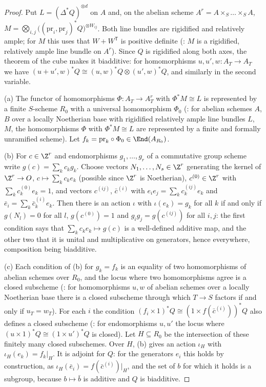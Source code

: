 \begin{proof}
Put $L=(\Delta^*Q)^{\otimes d}$ on $A$ and, on the abelian scheme $A^r=A\times_S\dots\times_SA$,
$M=\bigotimes_{i,j}\bigl((\mathrm{pr}_i,\mathrm{pr}_j)^*Q\bigr)^{\otimes W_{ij}}$. Both line bundles are rigidified and relatively ample; for
$M$ this uses that $W+W^{\mathsf T}$ is positive definite (: $M$ is a rigidified, relatively ample
line bundle on $A^r$). Since $Q$ is rigidified along both axes, the theorem of the cube makes it biadditive: for homomorphisms
$u,u',w:A_T\to A_T$ we have $(u+u',w)^*Q\cong(u,w)^*Q\otimes(u',w)^*Q$, and similarly in the second variable.

(a) The functor of homomorphisms $\Phi:A_T\to A^r_T$ with $\Phi^*M\cong L$ is represented by a finite $S$-scheme $R_0$ with a universal
homomorphism $\Phi_0$ (: for abelian schemes $A$, $B$ over a
locally Noetherian base with rigidified relatively ample line bundles $L$, $M$, the homomorphisms $\Phi$ with $\Phi^*M\cong L$ are represented
by a finite and formally unramified scheme). Let $f_k=\mathrm{pr}_k\circ\Phi_0\in\End(A_{R_0})$.

(b) For $c\in\Z^r$ and endomorphisms $g_1,\dots,g_r$ of a commutative group scheme write $g(c)=\sum_kc_kg_k$. Choose vectors
$N_1,\dots,N_s\in\Z^r$ generating the kernel of $\Z^r\to O$, $c\mapsto\sum_kc_ke_k$ (possible since $\Z^r$ is Noetherian), $c^{(0)}\in\Z^r$ with
$\sum_kc^{(0)}_ke_k=1$, and vectors $c^{(ij)}$, $\bar c^{(i)}$ with $e_ie_j=\sum_kc^{(ij)}_ke_k$ and $\bar e_i=\sum_k\bar c^{(i)}_ke_k$. Then there is an
action $\iota$ with $\iota(e_k)=g_k$ for all $k$ if and only if $g(N_l)=0$ for all $l$, $g(c^{(0)})=1$ and $g_ig_j=g(c^{(ij)})$ for all $i,j$: the first condition says that $\sum_kc_ke_k\mapsto g(c)$ is a
well-defined additive map, and the other two that it is unital and multiplicative on generators, hence everywhere, composition being
biadditive.

(c) Each condition of (b) for $g_k=f_k$ is an equality of two homomorphisms of abelian schemes over $R_0$, and the locus where two
homomorphisms agree is a closed subscheme (: for homomorphisms $u,w$
of abelian schemes over a locally Noetherian base there is a closed subscheme through which $T\to S$ factors if and only if $u_T=w_T$). For
each $i$ the condition $(f_i\times1)^*Q\cong(1\times f(\bar c^{(i)}))^*Q$ also defines a closed subscheme
(: for endomorphisms $u,u'$ the locus where
$(u\times1)^*Q\cong(1\times u')^*Q$ is closed). Let $H\subseteq R_0$ be the intersection of these finitely many closed subschemes. Over $H$, (b)
gives an action $\iota_H$ with $\iota_H(e_k)=f_k|_H$. It is adjoint for $Q$: for the generators $e_i$ this holds by construction, as
$\iota_H(\bar e_i)=f(\bar c^{(i)})|_H$, and the set of $b$ for which it holds is a subgroup, because $b\mapsto\bar b$ is additive and $Q$ is
biadditive.


\end{proof}
